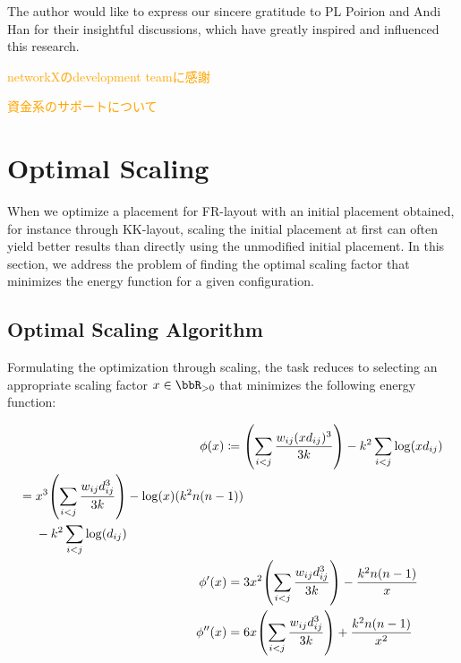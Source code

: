 \documentclass[dvipdfmx,lettersize,journal]{IEEEtran}
\newcommand{\orange}[1]{\textcolor{orange}{#1}}
\newcommand{\defeq}{\coloneqq}
\begin{document}
The author would like to express our sincere gratitude to PL Poirion and Andi Han for their insightful discussions, which have greatly inspired and influenced this research.

\orange{networkXのdevelopment teamに感謝}

\orange{資金系のサポートについて}


\appendices

\section{Optimal Scaling}\label{sec:scaling}

When we optimize a placement for FR-layout with an initial placement obtained, for instance through KK-layout, scaling the initial placement at first can often yield better results than directly using the unmodified initial placement.
In this section, we address the problem of finding the optimal scaling factor that minimizes the energy function for a given configuration.

\subsection{Optimal Scaling Algorithm}\label{ssec:scalingAlgorithm}

Formulating the optimization through scaling, the task reduces to selecting an appropriate scaling factor $x \in \bbR_{> 0}$ that minimizes the following energy function:

\begin{align*}
  \phi(x) \defeq {} & \qty(\sum_{i < j} \frac{w_{ij} (xd_{ij})^3}{3k}) - k^2 \sum_{i < j} \log(x d_{ij})                                     \\
  \begin{split}
    = {} & x^3 \qty(\sum_{i < j} \frac{w_{ij} d_{ij}^3}{3k}) - \log(x)(k^2 n(n-1)) \\
         & - k^2 \sum_{i < j} \log(d_{ij})
  \end{split} \\
  \phi'(x) = {}     & 3x^2 \qty(\sum_{i < j} \frac{w_{ij} d_{ij}^3}{3k}) - \frac{k^2 n(n-1)}{x}                                              \\
  \phi''(x) = {}    & 6x \qty(\sum_{i < j} \frac{w_{ij} d_{ij}^3}{3k}) + \frac{k^2 n(n-1)}{x^2}
\end{align*}
\end{document}
